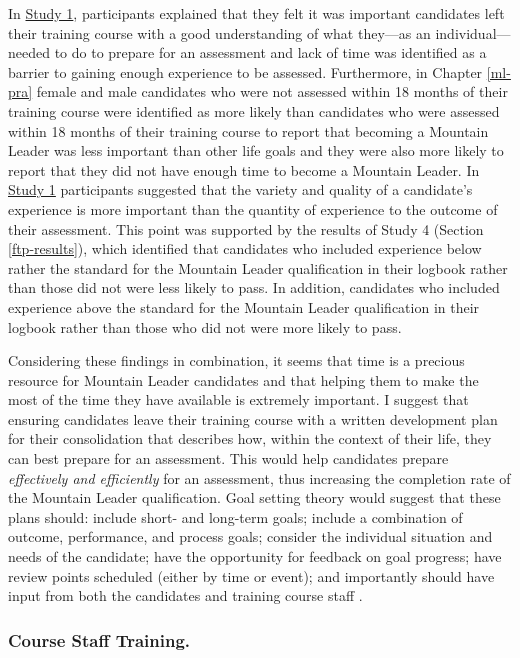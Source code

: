 \documentclass[
  12pt,
  a4paper,
]{book}
\begin{document}
In \protect\hyperlink{ml-qualitative}{Study 1}, participants explained that they felt it was important candidates left their training course with a good understanding of what they---as an individual---needed to do to prepare for an assessment and lack of time was identified as a barrier to gaining enough experience to be assessed. Furthermore, in Chapter \ref{ml-pra} female and male candidates who were not assessed within 18 months of their training course were identified as more likely than candidates who were assessed within 18 months of their training course to report that becoming a Mountain Leader was less important than other life goals and they were also more likely to report that they did not have enough time to become a Mountain Leader. In \protect\hyperlink{ml-qualitative}{Study 1} participants suggested that the variety and quality of a candidate's experience is more important than the quantity of experience to the outcome of their assessment. This point was supported by the results of Study 4 (Section \ref{ftp-results}), which identified that candidates who included experience below rather the standard for the Mountain Leader qualification in their logbook rather than those did not were less likely to pass. In addition, candidates who included experience above the standard for the Mountain Leader qualification in their logbook rather than those who did not were more likely to pass.

Considering these findings in combination, it seems that time is a precious resource for Mountain Leader candidates and that helping them to make the most of the time they have available is extremely important. I suggest that ensuring candidates leave their training course with a written development plan for their consolidation that describes how, within the context of their life, they can best prepare for an assessment. This would help candidates prepare \emph{effectively and efficiently} for an assessment, thus increasing the completion rate of the Mountain Leader qualification. Goal setting theory would suggest that these plans should: include short- and long-term goals; include a combination of outcome, performance, and process goals; consider the individual situation and needs of the candidate; have the opportunity for feedback on goal progress; have review points scheduled (either by time or event); and importantly should have input from both the candidates and training course staff \citep[cf.~][]{Gould2005, Weinberg2014}.

\hypertarget{course-staff-training.}{%
\subsubsection{Course Staff Training.}\label{course-staff-training.}}
\end{document}
